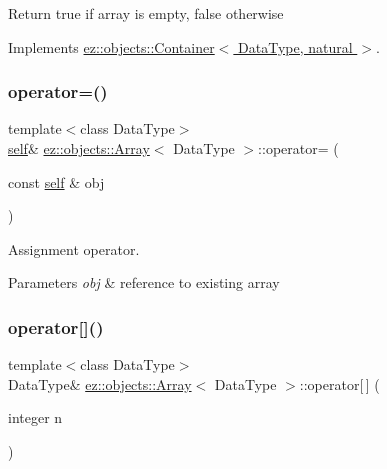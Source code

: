 Return true if array is empty, false otherwise 

Implements \hyperlink{classez_1_1objects_1_1Container_a205eb4f8a4fe967d425fdf04e5db5f93}{ez\+::objects\+::\+Container$<$ Data\+Type, natural $>$}.

\mbox{\label{classez_1_1objects_1_1Array_a243625ca16cb6b1f7a7f68dc7a1922cf}} 
\subsubsection{\texorpdfstring{operator=()}{operator=()}}
{\footnotesize\ttfamily template$<$class Data\+Type$>$ \\
\hyperlink{classez_1_1objects_1_1Array}{self}\& \hyperlink{classez_1_1objects_1_1Array}{ez\+::objects\+::\+Array}$<$ Data\+Type $>$\+::operator= (\begin{DoxyParamCaption}\item[{const \hyperlink{classez_1_1objects_1_1Array}{self} \&}]{obj }\end{DoxyParamCaption})\hspace{0.3cm}{\ttfamily [inline]}}

Assignment operator. 
\begin{DoxyParams}{Parameters}
{\em obj} & reference to existing array \\
\hline
\end{DoxyParams}
\mbox{\label{classez_1_1objects_1_1Array_add86e335b90914397700e6f2cad45077}} 
\subsubsection{\texorpdfstring{operator[]()}{operator[]()}}
{\footnotesize\ttfamily template$<$class Data\+Type$>$ \\
Data\+Type\& \hyperlink{classez_1_1objects_1_1Array}{ez\+::objects\+::\+Array}$<$ Data\+Type $>$\+::operator\mbox{[}$\,$\mbox{]} (\begin{DoxyParamCaption}\item[{integer}]{n }\end{DoxyParamCaption})\hspace{0.3cm}{\ttfamily [inline]}}

